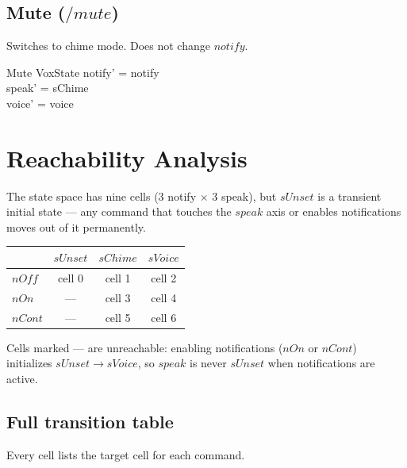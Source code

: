 \documentclass[a4paper,10pt,fleqn]{article}
\begin{document}
\subsection{Mute ($\mathord{/mute}$)}

Switches to chime mode. Does not change $notify$.

\begin{schema}{Mute}
  \Delta VoxState
  \where
  notify' = notify \\
  speak' = sChime \\
  voice' = voice
\end{schema}

\section{Reachability Analysis}

The state space has nine cells (3 notify $\times$ 3 speak),
but $sUnset$ is a transient initial state --- any command that
touches the $speak$ axis or enables notifications moves out of
it permanently.

\begin{center}
  \begin{tabular}{l|c|c|c}
    & $sUnset$ & $sChime$ & $sVoice$ \\
    \hline
    $nOff$  & cell 0 & cell 1 & cell 2 \\
    $nOn$   & --- & cell 3 & cell 4 \\
    $nCont$ & --- & cell 5 & cell 6 \\
  \end{tabular}
\end{center}

Cells marked --- are unreachable: enabling notifications ($nOn$
or $nCont$) initializes $sUnset \to sVoice$, so $speak$ is never
$sUnset$ when notifications are active.

\subsection{Full transition table}

Every cell lists the target cell for each command.
\end{document}
